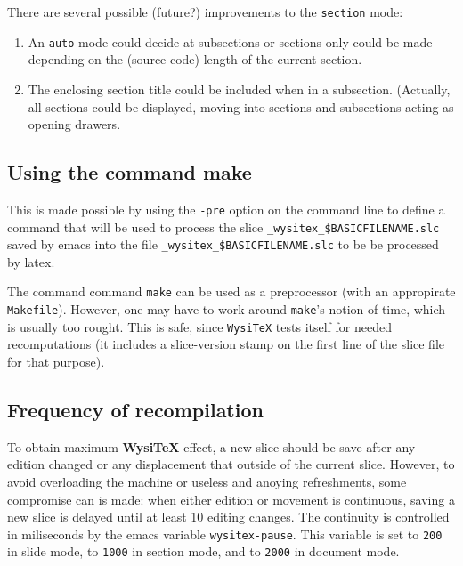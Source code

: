 \documentclass{article}
\let \lst \verb
\def \wysitex{\textbf {WysiTeX}}
\begin{document}
There are several possible (future?) improvements to the \lst"section" mode:
\begin {enumerate}

\item
An \lst"auto" mode could decide  at subsections or sections only could be made
depending on the (source code) length of the current section. 

\item
The enclosing section title could be included when in a subsection.
(Actually, all sections could be displayed, moving into sections and
subsections acting as opening drawers.

\end {enumerate}


\subsection {Using the command make}%

This is made possible by using the \lst"-pre" option on the command line
to  define a command that will be used to process the slice 
\lst"_wysitex_$BASICFILENAME.slc" saved by emacs
into the file \lst"_wysitex_$BASICFILENAME.slc" to be be processed 
by latex.

The command command \lst"make" can be used as a preprocessor (with an
appropirate \lst"Makefile").  However, one may have to work around
\lst"make"'s notion of time, which is usually too rought. 
This is safe, since
\lst"WysiTeX" tests itself for needed recomputations (it includes
a slice-version stamp on the first line of the slice file for that
purpose). 

\subsection {Frequency of recompilation}%

To obtain maximum {\wysitex} effect, a new slice should be save after any
edition changed or any displacement that outside of the current slice.
However, to avoid overloading the machine or useless and anoying
refreshments, some compromise can is made: when either edition or movement
is continuous, saving a new slice is delayed until at least 10 editing
changes. The continuity is controlled in miliseconds by the emacs variable
\lst"wysitex-pause". This variable is set to \lst"200" in slide
mode, to \lst"1000" in section mode, and to \lst"2000" in document mode.
\end{document}
